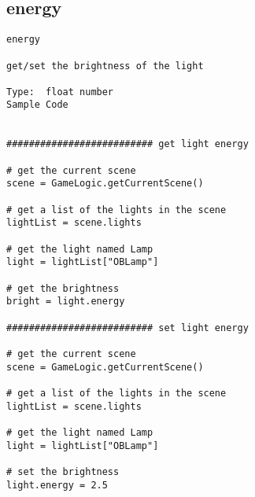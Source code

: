 \subsection{energy}
\begin{verbatim}
energy

get/set the brightness of the light

Type:  float number
Sample Code


########################## get light energy

# get the current scene
scene = GameLogic.getCurrentScene()

# get a list of the lights in the scene
lightList = scene.lights

# get the light named Lamp
light = lightList["OBLamp"]

# get the brightness
bright = light.energy

########################## set light energy

# get the current scene
scene = GameLogic.getCurrentScene()

# get a list of the lights in the scene
lightList = scene.lights

# get the light named Lamp
light = lightList["OBLamp"]

# set the brightness
light.energy = 2.5
\end{verbatim}

